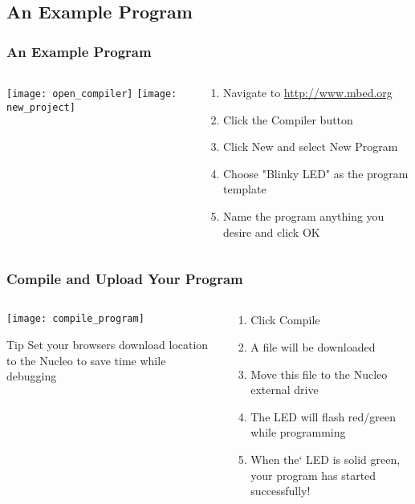 \subsection{An Example Program}
\begin{frame}
	\frametitle{An Example Program}
	\begin{columns}[T]
		\begin{column}{0.5\textwidth}
			\texttt{[image: open\_compiler]}
			\vspace{1ex}
			\texttt{[image: new\_project]}
		\end{column}
		\begin{column}{0.5\textwidth}
			\begin{enumerate}
				\item Navigate to \url{http://www.mbed.org}
				\item Click the Compiler button
				\item Click New and select New Program
				\item Choose "Blinky LED" as the program template
				\item Name the program anything you desire and click OK
			\end{enumerate}
		\end{column}
	\end{columns}
\end{frame}

\begin{frame}
	\frametitle{Compile and Upload Your Program}
	\begin{columns}[T]
		\begin{column}{0.5\textwidth}
			\texttt{[image: compile\_program]}
			\begin{block}{Tip}
				Set your browsers download location to the Nucleo to save time while debugging
			\end{block}
		\end{column}
		\begin{column}{0.5\textwidth}
			\begin{enumerate}
				\item Click Compile
				\item A file will be downloaded
				\item Move this file to the Nucleo external drive
				\item The LED will flash red/green while programming
				\item When the` LED is solid green, your program has started successfully!
			\end{enumerate}
		\end{column}
	\end{columns}
\end{frame}